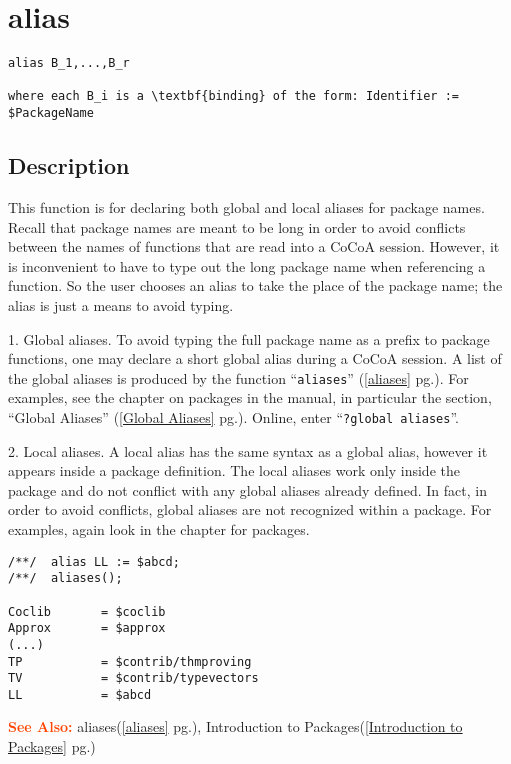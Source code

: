 \documentclass[a4paper]{mybook}
\newenvironment{command}{}{} %
\newcommand\SeeAlso{\par\textcolor{OrangeRed}{\textbf{\large See Also: }}}
\begin{document}
\section{alias}
\label{alias}
\begin{command} %


\begin{Verbatim}[label=syntax, rulecolor=\color{MidnightBlue},
frame=single]
alias B_1,...,B_r

where each B_i is a \textbf{binding} of the form: Identifier := $PackageName
\end{Verbatim}


\subsection*{Description}

This function is for declaring both global and local aliases for
package names.  Recall that package names are meant to be long in
order to avoid conflicts between the names of functions that are read
into a CoCoA session.  However, it is inconvenient to have to type out
the long package name when referencing a function.  So the user
chooses an alias to take the place of the package name; the alias is
just a means to avoid typing.
\par 
1.  Global aliases.  To avoid typing the full package name as a prefix
to package functions, one may declare a short global alias during a
CoCoA session.  A list of the global aliases is produced by the
function ``\verb&aliases&'' (\ref{aliases} pg.\pageref{aliases}).  For examples, see the chapter on packages in the
manual, in particular the section, ``Global Aliases'' (\ref{Global Aliases} pg.\pageref{Global Aliases}).  Online, enter
``\verb&?global aliases&''.
\par 
2.  Local aliases.  A local alias has the same syntax as a global
alias, however it appears inside a package definition.  The local
aliases work only inside the package and do not conflict with any
global aliases already defined.  In fact, in order to avoid conflicts,
global aliases are not recognized within a package.  For examples,
again look in the chapter for packages.
\begin{Verbatim}[label=example, rulecolor=\color{PineGreen}, frame=single]
/**/  alias LL := $abcd;
/**/  aliases();

Coclib       = $coclib
Approx       = $approx
(...)
TP           = $contrib/thmproving
TV           = $contrib/typevectors
LL           = $abcd
\end{Verbatim}


\SeeAlso %
  aliases(\ref{aliases} pg.\pageref{aliases}), 
    Introduction to Packages(\ref{Introduction to Packages} pg.\pageref{Introduction to Packages})
\end{command} %
\end{document}
